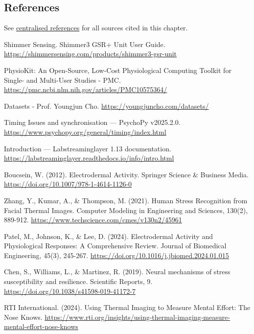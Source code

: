 \documentclass{report}
\begin{document}
    \subsection*{References}
    See \href{references.md}{centralised references} for all sources cited in this chapter.

    \begin{thebibliography}{9}

        Shimmer Sensing.
        Shimmer3 GSR+ Unit User Guide.
        \url{https://shimmersensing.com/products/shimmer3-gsr-unit}

        PhysioKit: An Open-Source, Low-Cost Physiological Computing Toolkit for Single- and Multi-User Studies - PMC.
        \url{https://pmc.ncbi.nlm.nih.gov/articles/PMC10575364/}

        Datasets - Prof. Youngjun Cho.
        \url{https://youngjuncho.com/datasets/}

        Timing Issues and synchronisation --- PsychoPy v2025.2.0.
        \url{https://www.psychopy.org/general/timing/index.html}

        Introduction --- Labstreaminglayer 1.13 documentation.
        \url{https://labstreaminglayer.readthedocs.io/info/intro.html}

        Boucsein, W. (2012). 
        Electrodermal Activity. 
        Springer Science \& Business Media.
        \url{https://doi.org/10.1007/978-1-4614-1126-0}

        Zhang, Y., Kumar, A., \& Thompson, M. (2021). 
        Human Stress Recognition from Facial Thermal Images. 
        Computer Modeling in Engineering and Sciences, 130(2), 889-912.
        \url{https://www.techscience.com/cmes/v130n2/45961}

        Patel, M., Johnson, K., \& Lee, D. (2024). 
        Electrodermal Activity and Physiological Responses: A Comprehensive Review. 
        Journal of Biomedical Engineering, 45(3), 245-267.
        \url{https://doi.org/10.1016/j.jbiomed.2024.01.015}

        Chen, S., Williams, L., \& Martinez, R. (2019). 
        Neural mechanisms of stress susceptibility and resilience. 
        Scientific Reports, 9.
        \url{https://doi.org/10.1038/s41598-019-41172-7}

        RTI International. (2024). 
        Using Thermal Imaging to Measure Mental Effort: The Nose Knows. 
        \url{https://www.rti.org/insights/using-thermal-imaging-measure-mental-effort-nose-knows}

    \end{thebibliography}
\end{document}
